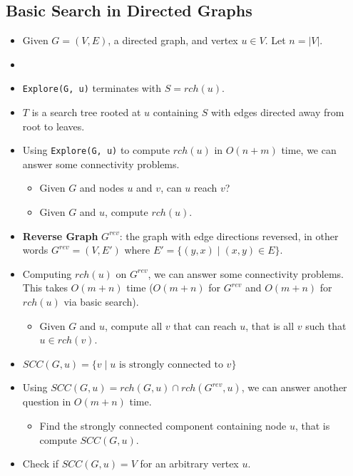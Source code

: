 \subsection{Basic Search in Directed Graphs}
\begin{itemize}
    \item Given $G = (V, E)$, a directed graph, and vertex $u \in V$. Let $n = \left| V \right|$.
    \item[] 
    \item \texttt{Explore(G, u)} terminates with $S = rch(u)$.
    \item $T$ is a search tree rooted at $u$ containing $S$ with edges directed away from root to leaves.
    \item Using \texttt{Explore(G, u)} to compute $rch(u)$ in $O(n + m)$ time, we can answer some connectivity problems.
    \begin{itemize}
        \item Given $G$ and nodes $u$ and $v$, can $u$ reach $v$?
        \item Given $G$ and $u$, compute $rch(u)$.
    \end{itemize}
    \item \textbf{Reverse Graph} $G^{rev}$: the graph with edge directions reversed, in other words $G^{rev} = (V, E')$ where $E' = \{ (y, x) \mid (x, y) \in E \}$.
    \item Computing $rch(u)$ on $G^{rev}$, we can answer some connectivity problems. This takes $O(m + n)$ time ($O(m + n)$ for $G^{rev}$ and $O(m + n)$ for $rch(u)$ via basic search).
    \begin{itemize}
        \item Given $G$ and $u$, compute all $v$ that can reach $u$, that is all $v$ such that $u \in rch(v)$.
    \end{itemize}
    \item $SCC(G, u) = \{ v \mid u \text{ is strongly connected to } v \}$
    \item Using $SCC(G, u) = rch(G, u) \cap rch (G^{rev}, u)$, we can answer another question in $O(m + n)$ time.
    \begin{itemize}
        \item Find the strongly connected component containing node $u$, that is compute $SCC(G, u)$.
    \end{itemize}
    \item Check if $SCC(G, u) = V$ for an arbitrary vertex $u$.
    \begin{itemize}

\end{itemize}
\end{itemize}
